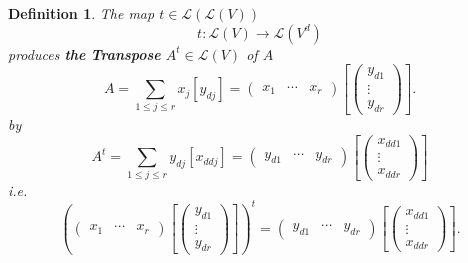 \documentclass[aps,preprint]{revtex4}
\newtheorem{definition}[theorem]{Definition}
\begin{document}
\begin{definition}
The map $t\in \mathcal{L}\left( \mathcal{L}\left( V\right) \right) $ 
\begin{equation}
t:\mathcal{L}\left( V\right) \rightarrow \mathcal{L}\left( V^{d}\right)
\end{equation}%
produces \textbf{the} \textbf{Transpose} $A^{t}\in \mathcal{L}\left(
V\right) $ of $A$%
\begin{equation}
A=\sum_{1\leq j\leq r}x_{j}\left[ y_{dj}\right] =\left( 
\begin{array}{ccc}
x_{1} & \cdots & x_{r}%
\end{array}%
\right) \left[ \left( 
\begin{array}{c}
y_{d1} \\ 
\vdots \\ 
y_{dr}%
\end{array}%
\right) \right] .
\end{equation}%
by 
\begin{equation}
A^{t}=\sum_{1\leq j\leq r}y_{dj}\left[ x_{ddj}\right] =\left( 
\begin{array}{ccc}
y_{d1} & \cdots & y_{dr}%
\end{array}%
\right) \left[ \left( 
\begin{array}{c}
x_{dd1} \\ 
\vdots \\ 
x_{ddr}%
\end{array}%
\right) \right]
\end{equation}%
i.e. 
\begin{equation}
\left( \left( 
\begin{array}{ccc}
x_{1} & \cdots & x_{r}%
\end{array}%
\right) \left[ \left( 
\begin{array}{c}
y_{d1} \\ 
\vdots \\ 
y_{dr}%
\end{array}%
\right) \right] \right) ^{t}=\left( 
\begin{array}{ccc}
y_{d1} & \cdots & y_{dr}%
\end{array}%
\right) \left[ \left( 
\begin{array}{c}
x_{dd1} \\ 
\vdots \\ 
x_{ddr}%
\end{array}%
\right) \right] .
\end{equation}
\end{definition}
\end{document}
